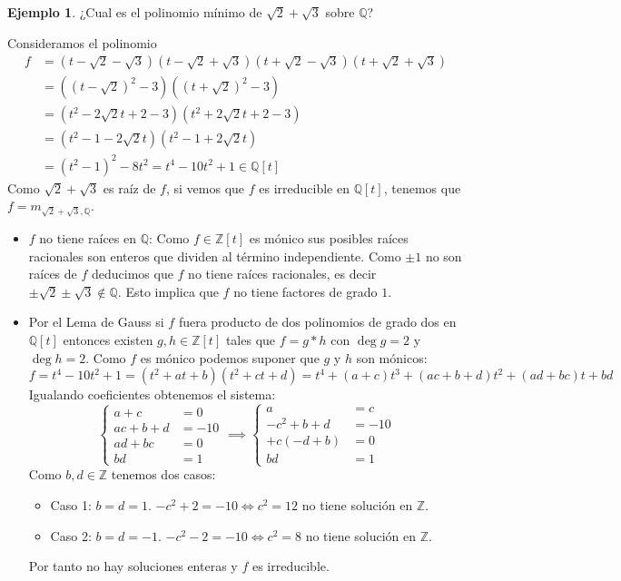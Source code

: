 \documentclass[10pt, spanish]{report}
\theoremstyle{definition}
\newtheorem*{ej}{Ejemplo}
\newcommand{\Z}{\mathbb{Z}}
\newcommand{\Q}{\mathbb{Q}}
\begin{document}
\begin{ej}
    ¿Cual es el polinomio mínimo de $\sqrt{2}+\sqrt{3}$ sobre $\Q$?

    Consideramos el polinomio
    \begin{align*}
        f&=(t-\sqrt{2}-\sqrt{3})(t-\sqrt{2}+\sqrt{3})(t+\sqrt{2}-\sqrt{3})(t+\sqrt{2}+\sqrt{3})\\
         &=((t-\sqrt{2})^2-3) ((t+\sqrt{2})^2-3)\\
         &=(t^2-2\sqrt{2}t+2-3)(t^2+2\sqrt{2}t+2-3)\\
         &=(t^2-1-2\sqrt{2}t)(t^2-1+2\sqrt{2}t)\\
         &=(t^2-1)^2-8t^2=t^4-10t^2+1\in\Q[t]
    \end{align*}
    Como $\sqrt{2}+\sqrt{3}$ es raíz de $f$, si vemos que $f$ es irreducible en
    $\Q[t]$, tenemos que $f=m_{\sqrt{2}+\sqrt{3},\Q}$.
    \begin{itemize}
        \item $f$ no tiene raíces en $\Q$: Como $f\in\Z[t]$ es mónico sus
            posibles raíces racionales son enteros que dividen al término
            independiente. Como $\pm1$ no son raíces de $f$ deducimos que $f$ no
            tiene raíces racionales, es decir $\pm\sqrt{2}\pm\sqrt{3}\not\in\Q$.
            Esto implica que $f$ no tiene factores de grado $1$.
        \item Por el Lema de Gauss si $f$ fuera producto de dos polinomios de
            grado dos en $\Q[t]$ entonces existen $g,h\in\Z[t]$ tales que
            $f=g*h$ con $\deg{g}=2$ y $\deg{h}=2$. Como $f$ es mónico podemos
            suponer que $g$ y $h$ son mónicos:
            \[f=t^4-10t^2+1=(t^2+at+b)(t^2+ct+d)=t^4+(a+c)t^3+(ac+b+d)t^2+(ad+bc)t+bd\]
            Igualando coeficientes obtenemos el sistema:
            \[
                \begin{cases}
                    a+c &= 0\\
                    ac+b+d &= -10\\
                    ad+bc&=0\\
                    bd&=1
                \end{cases}
                \implies
                \begin{cases}
                    a&=c\\
                    -c^2+b+d&=-10\\
                    +c(-d+b)&=0\\
                    bd&=1
                \end{cases}
            \]
            Como $b,d\in \Z$ tenemos dos casos:
            \begin{itemize}
                \item Caso 1: $b=d=1$. $-c^2+2=-10\Leftrightarrow c^2=12$ no
                    tiene solución en $\Z$.
                \item Caso 2: $b=d=-1$. $-c^2-2=-10\Leftrightarrow c^2=8$ no
                    tiene solución en $\Z$.
            \end{itemize}
            Por tanto no hay soluciones enteras y $f$ es irreducible.
    \end{itemize}
\end{ej}
\end{document}
